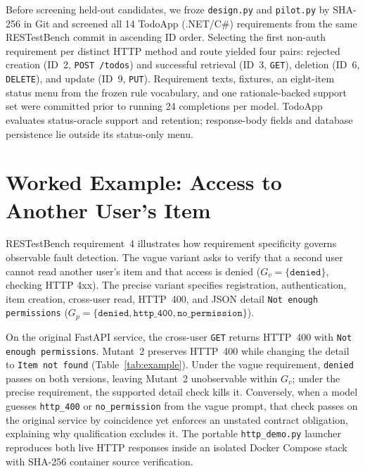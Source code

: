 \documentclass[sigconf,nonacm]{acmart}
\begin{document}
Before screening held-out candidates, we froze \texttt{design.py} and \texttt{pilot.py} by SHA-256 in Git and screened all 14 TodoApp (.NET/C\#) requirements from the same RESTestBench commit in ascending ID order. Selecting the first non-auth requirement per distinct HTTP method and route yielded four pairs: rejected creation (ID~2, \texttt{POST /todos}) and successful retrieval (ID~3, \texttt{GET}), deletion (ID~6, \texttt{DELETE}), and update (ID~9, \texttt{PUT}). Requirement texts, fixtures, an eight-item status menu from the frozen rule vocabulary, and one rationale-backed support set were committed prior to running 24 completions per model. TodoApp evaluates status-oracle support and retention; response-body fields and database persistence lie outside its status-only menu.



\section{Worked Example: Access to Another User's Item}
RESTestBench requirement~4 illustrates how requirement specificity governs observable fault detection. The vague variant asks to verify that a second user cannot read another user's item and that access is denied ($G_v=\{\texttt{denied}\}$, checking HTTP 4xx). The precise variant specifies registration, authentication, item creation, cross-user read, HTTP~400, and JSON detail \texttt{Not enough permissions} ($G_p=\{\texttt{denied},\texttt{http\_400},\texttt{no\_permission}\}$).

On the original FastAPI service, the cross-user \texttt{GET} returns HTTP~400 with \texttt{Not enough permissions}. Mutant~2 preserves HTTP~400 while changing the detail to \texttt{Item not found} (Table~\ref{tab:example}). Under the vague requirement, \texttt{denied} passes on both versions, leaving Mutant~2 unobservable within $G_v$; under the precise requirement, the supported detail check kills it. Conversely, when a model guesses \texttt{http\_400} or \texttt{no\_permission} from the vague prompt, that check passes on the original service by coincidence yet enforces an unstated contract obligation, explaining why qualification excludes it. The portable \texttt{http\_demo.py} launcher reproduces both live HTTP responses inside an isolated Docker Compose stack with SHA-256 container source verification.
\end{document}
